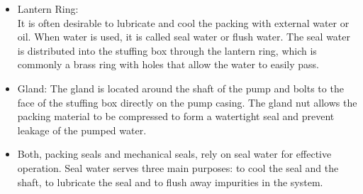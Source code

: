 \begin{itemize}
\item Lantern Ring:\\
It is often desirable to lubricate and cool the packing with external water or oil. When water is used, it is called seal water or flush water. The seal water is distributed into the stuffing box through the lantern ring, which is commonly a brass ring with holes that allow the water to easily pass.

\item Gland: The gland is located around the shaft of the pump and bolts to the face of the stuffing box directly on the pump casing.  The gland nut allows the packing material to be compressed to form a watertight seal and prevent leakage of the pumped water.

\item Both, packing seals and mechanical seals, rely on seal water for effective operation. Seal water serves three main purposes: to cool the seal and the shaft, to lubricate the seal and to flush away impurities in the system.

\end{itemize}


